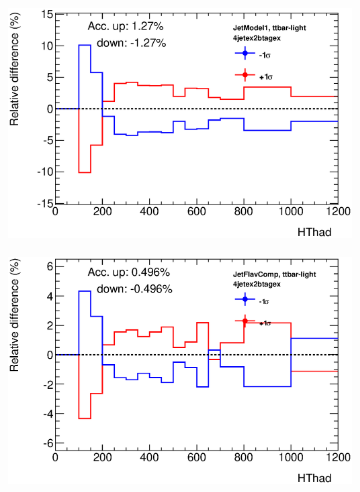 \begin{figure}[tpb!]
  \centering
  \begin{subfigure}{0.47\textwidth}
     \includegraphics[width=\textwidth]{Analysis/Figures_ttH/ControlPlots/4jetex2btagex_ttbar-light_JetModel1.eps}
  \caption{} \label{fig:control_JetModel1}
  \end{subfigure}
  \begin{subfigure}{0.47\textwidth}
     \includegraphics[width=\textwidth]{Analysis/Figures_ttH/ControlPlots/4jetex2btagex_ttbar-light_JetFlavComp.eps}
  \caption{} \label{fig:control_JetFlavComp}
  \end{subfigure} 
  \\
  \begin{subfigure}{0.47\textwidth}

\end{subfigure}
\end{figure}
